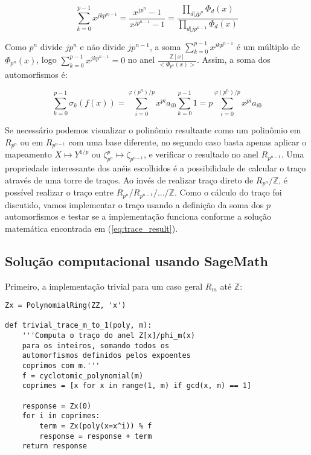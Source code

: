 \begin{equation}
    \sum_{k=0}^{p-1} x^{j k p^{m-1}} =\frac{x^{j p^{n}} - 1}{x^{j p^{n-1}} -1} = \frac{\prod_{d|j p^{n}} \Phi_d(x)}{\prod_{d|j p^{n-1}} \Phi_d(x)}
\end{equation}

Como $p^n$ divide $jp^n$ e não divide $jp^{n-1}$, a soma $\sum_{k=0}^{p-1} x^{j k p^{n-1}}$ é um múltiplo de $\Phi_{p^n}(x)$, logo
$\sum_{k=0}^{p-1} x^{j k p^{n-1}} = 0$ no anel $\frac{\mathbb{Z}[x]}{<\Phi_{p^n}(x)>}$. Assim, a soma dos automorfismos é:

\begin{equation}
    \sum_{k=0}^{p-1} \sigma_k(f(x)) = \sum_{i=0}^{\varphi(p^n)/p} x^{pi} a_{i0} \sum_{k=0}^{p-1} 1 = p \sum_{i=0}^{\varphi(p^n)/p} x^{pi} a_{i0}
\label{eq:trace_result}
\end{equation}

Se necessário podemos visualizar o polinômio resultante como um polinômio em $R_{p^{n}}$ ou em $R_{p^{n-1}}$ com uma base diferente, no segundo caso basta apenas aplicar o mapeamento
$X \mapsto Y^{1/p}$ ou $\zeta_{p^n}^p \mapsto \zeta_{p^{n-1}}$, e verificar o resultado no anel $R_{p^{n-1}}$. 
Uma propriedade interessante dos anéis escolhidos é a possibilidade de calcular o traço através de uma torre de traços. Ao invés de realizar traço direto de $R_{p^{n}}/\mathbb{Z}$, 
é possível realizar o traço entre $R_{p^{n}} / R_{p^{n-1}} / ... / \mathbb{Z}$. Como o cálculo do traço foi discutido, 
vamos implementar o traço usando a definição da soma dos $p$ automorfismos e testar se a implementação funciona conforme a solução matemática encontrada em (\ref{eq:trace_result}).

\subsection{Solução computacional usando SageMath}

Primeiro, a implementação trivial para um caso geral $R_{m}$ até $\mathbb{Z}$:

\begin{verbatim}
Zx = PolynomialRing(ZZ, 'x')

def trivial_trace_m_to_1(poly, m):
    '''Computa o traço do anel Z[x]/phi_m(x) 
    para os inteiros, somando todos os 
    automorfismos definidos pelos expoentes 
    coprimos com m.'''
    f = cyclotomic_polynomial(m)
    coprimes = [x for x in range(1, m) if gcd(x, m) == 1]

    response = Zx(0)
    for i in coprimes:
        term = Zx(poly(x=x^i)) % f
        response = response + term
    return response
\end{verbatim}

